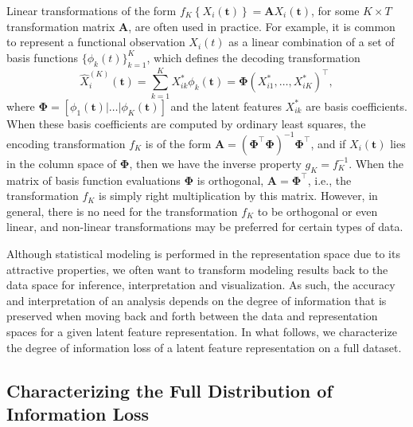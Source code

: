 Linear transformations of the form $f_{K} \left\{X_i(\mathbf{t})\right\} = \mathbf{A} X_i(\mathbf{t})$, for some $K \times T$ transformation matrix $\mathbf{A}$, are often used in practice.
For example, it is common to represent a functional observation $X_i(t)$ as a linear combination of a set of basis functions $\{\phi_k(t)\}_{k=1}^K$, which defines the decoding transformation
$$
\widehat{X}_i^{(K)} (\mathbf{t}) = \sum_{k=1}^K X_{ik}^* \phi_k(\mathbf{t}) = \boldsymbol{\Phi} \left(X_{i1}^*, \dots,  X_{iK}^* \right)^\top,
$$
where $\boldsymbol{\Phi} = \left[\phi_1(\mathbf{t}) | \dots | \phi_K(\mathbf{t}) \right]$ and the latent features $X_{ik}^*$ are basis coefficients. 
When these basis coefficients are computed by ordinary least squares, the encoding transformation $f_K$ is of the form $\mathbf{A} = \left( \boldsymbol{\Phi}^\top \boldsymbol{\Phi} \right)^{-1} \boldsymbol{\Phi}^\top$, and if $X_i(\mathbf{t})$ lies in the column space of $\boldsymbol{\Phi}$, then we have the inverse property $g_K=f^{-1}_K$.
When the matrix of basis function evaluations $\boldsymbol{\Phi}$ is orthogonal, $\mathbf{A} = \boldsymbol{\Phi}^\top$, i.e., the transformation $f_K$ is simply right multiplication by this matrix.
However, in general, there is no need for the transformation $f_K$ to be orthogonal or even linear, and non-linear transformations may be preferred for certain types of data.

Although statistical modeling is performed in the representation space due to its attractive properties, we often want to transform modeling results back to the data space for inference, interpretation and visualization. 
As such, the accuracy and interpretation of an analysis depends on the degree of information that is preserved when moving back and forth between the data and representation spaces for a given latent feature representation.
In what follows, we characterize the degree of information loss of a latent feature representation on a full dataset.


\subsection{Characterizing the Full Distribution of Information Loss}\label{sec:characterising-information-loss}

